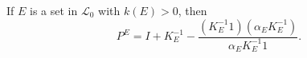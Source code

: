 If $E$ is a set in $\mathcal{L}_0$ with $k(E) > 0$, then
$$P^E = I + K_E^{-1} - \frac{(K_E^{-1}1)(\alpha_E K_E^{-1})}{\alpha_E K_E^{-1}1}.$$
